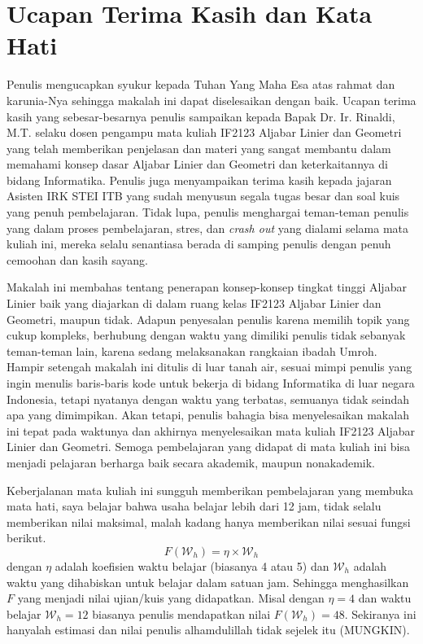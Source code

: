\section*{Ucapan Terima Kasih dan Kata Hati}
Penulis mengucapkan syukur kepada Tuhan Yang Maha Esa atas rahmat dan karunia-Nya sehingga makalah ini dapat diselesaikan dengan baik. Ucapan terima kasih yang sebesar-besarnya penulis sampaikan kepada Bapak Dr. Ir. Rinaldi, M.T. selaku dosen pengampu mata kuliah IF2123 Aljabar Linier dan Geometri yang telah memberikan penjelasan dan materi yang sangat membantu dalam memahami konsep dasar Aljabar Linier dan Geometri dan keterkaitannya di bidang Informatika. Penulis juga menyampaikan terima kasih kepada jajaran Asisten IRK STEI ITB yang sudah menyusun segala tugas besar dan soal kuis yang penuh pembelajaran. Tidak lupa, penulis menghargai teman-teman penulis yang dalam proses pembelajaran, stres, dan \textit{crash out} yang dialami selama mata kuliah ini, mereka selalu senantiasa berada di samping penulis dengan penuh cemoohan dan kasih sayang.

Makalah ini membahas tentang penerapan konsep-konsep tingkat tinggi Aljabar Linier baik yang diajarkan di dalam ruang kelas IF2123 Aljabar Linier dan Geometri, maupun tidak. Adapun penyesalan penulis karena memilih topik yang cukup kompleks, berhubung dengan waktu yang dimiliki penulis tidak sebanyak teman-teman lain, karena sedang melaksanakan rangkaian ibadah Umroh. Hampir setengah makalah ini ditulis di luar tanah air, sesuai mimpi penulis yang ingin menulis baris-baris kode untuk bekerja di bidang Informatika di luar negara Indonesia, tetapi nyatanya dengan waktu yang terbatas, semuanya tidak seindah apa yang dimimpikan. Akan tetapi, penulis bahagia bisa menyelesaikan makalah ini tepat pada waktunya dan akhirnya menyelesaikan mata kuliah IF2123 Aljabar Linier dan Geometri. Semoga pembelajaran yang didapat di mata kuliah ini bisa menjadi pelajaran berharga baik secara akademik, maupun nonakademik.

Keberjalanan mata kuliah ini sungguh memberikan pembelajaran yang membuka mata hati, saya belajar bahwa usaha belajar lebih dari 12 jam, tidak selalu memberikan nilai maksimal, malah kadang hanya memberikan nilai sesuai fungsi berikut.
$$
F(\mathcal{W}_h) = \eta \times \mathcal{W}_h
$$
dengan $\eta$ adalah koefisien waktu belajar (biasanya 4 atau 5) dan $\mathcal{W}_h$ adalah waktu yang dihabiskan untuk belajar dalam satuan jam. Sehingga menghasilkan $F$ yang menjadi nilai ujian/kuis yang didapatkan. Misal dengan $\eta = 4$ dan waktu belajar $\mathcal{W}_h = 12$ biasanya penulis mendapatkan nilai $F(\mathcal{W}_h) = 48$. Sekiranya ini hanyalah estimasi dan nilai penulis alhamdulillah tidak sejelek itu (MUNGKIN).

